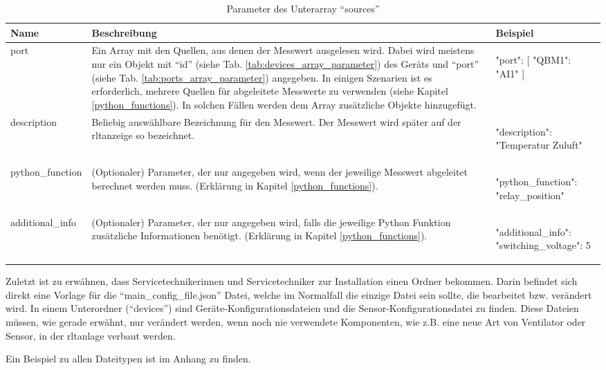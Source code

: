 \begin{enumerate}
	\begin{table}[H]
		\caption{Parameter des Unterarray \enquote{sources}}
		\label{tab:sources_array_parameter}
			\begin{tabular}{p{} p{} | p{}}
			\toprule
			\textbf{Name} & \textbf{Beschreibung} & \textbf{Beispiel} \\
			\midrule
			port                & Ein Array mit den Quellen, aus denen der Messwert ausgelesen wird. Dabei wird meistens nur ein Objekt mit \enquote{id} (siehe Tab. \ref{tab:devices_array_parameter}) des Geräts und \enquote{port} (siehe Tab. \ref{tab:ports_array_parameter}) angegeben. In einigen Szenarien ist es erforderlich, mehrere Quellen für abgeleitete Messwerte zu verwenden (siehe Kapitel \ref{python_functions}). In solchen Fällen werden dem Array zusätzliche Objekte hinzugefügt. &  
			\begin{jsonTable}
"port": [
	{ "QBM1": "AI1" }
]
			\end{jsonTable} 
			\\
			description         & Beliebig auswählbare Bezeichnung für den Messwert. Der Messwert wird später auf der \acs{rltanzeige} so bezeichnet. & 
			\begin{jsonTable}
"description": "Temperatur Zuluft"
			\end{jsonTable}  
			\\
			python\_function    & (Optionaler) Parameter, der nur angegeben wird, wenn der jeweilige Messwert abgeleitet berechnet werden muss. (Erklärung in Kapitel \ref{python_functions}). & 
			\begin{jsonTable}
"python_function": "relay_position"
			\end{jsonTable} 
			\\
			additional\_info    & (Optionaler) Parameter, der nur angegeben wird, falls die jeweilige Python Funktion zusätzliche Informationen benötigt. (Erklärung in Kapitel \ref{python_functions}). & 
			\begin{jsonTable}
"additional_info": { "switching_voltage": 5 }
			\end{jsonTable} 
			\\
			\bottomrule
		\end{tabular}
	\end{table} 
					
\end{enumerate}

Zuletzt ist zu erwähnen, dass Servicetechnikerinnen und Servicetechniker zur Installation einen Ordner bekommen. Darin befindet sich direkt eine Vorlage für die \enquote{main\_config\_file.json} Datei, welche im Normalfall die einzige Datei sein sollte, die bearbeitet bzw. verändert wird.
In einem Unterordner (\enquote{devices}) sind Geräte-Konfigurationsdateien und die Sensor-Konfigurationsdatei zu finden. Diese Dateien müssen, wie gerade erwähnt, nur verändert werden, wenn noch nie verwendete Komponenten, wie z.B. eine neue Art von Ventilator oder Sensor, in der \acs{rltanlage} verbaut werden.

Ein Beispiel zu allen Dateitypen ist im Anhang zu finden.




